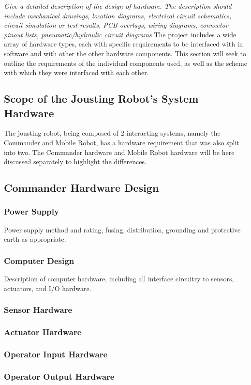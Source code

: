 \documentclass[MTRX3700report.tex]{subfiles}
\begin{document}
  \textit{Give a detailed description of the design of hardware. The description should include mechanical drawings, location diagrams, electrical circuit schematics, circuit simulation or test results, PCB overlays, wiring diagrams, connector pinout lists, pneumatic/hydraulic circuit diagrams}
  The project includes a wide array of hardware types, each with specific requirements to be interfaced with in software and with other the other hardware components. This section will seek to outline the requirements of the individual components used, as well as the scheme with which they were interfaced with each other.

  \subsection{Scope of the Jousting Robot's System Hardware}
  The jousting robot, being composed of 2 interacting systems, namely the Commander and Mobile Robot, has a hardware requirement that was also split into two.
  The Commander hardware and Mobile Robot hardware will be here discussed separately to highlight the differences.
  \subsection{Commander Hardware Design}
    \subsubsection{Power Supply}
    Power supply method and rating, fusing, distribution, grounding and protective earth as appropriate.
    \subsubsection{Computer Design}
    Description of computer hardware, including all interface circuitry to sensors, actuators, and I/O hardware.
    \subsubsection{Sensor Hardware}
    \subsubsection{Actuator Hardware}
    \subsubsection{Operator Input Hardware}
    \subsubsection{Operator Output Hardware}
\end{document}
